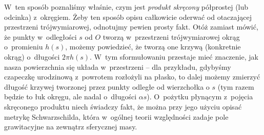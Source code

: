 W~ten sposób 
poznaliśmy właśnie, czym jest \emph{produkt skręcony} półprostej (lub odcinka) z~okręgiem. Żeby ten sposób opisu całkowicie oderwać od otaczającej przestrzeni trójwymiarowej, odnotujmy pewien prosty fakt. Otóż zamiast mówić, że punkty w~odległości $s$ od $O$ tworzą w~przestrzeni trójwymiarowej okrąg o~promieniu $h(s)$, możemy powiedzieć, że tworzą one krzywą (konkretnie okrąg) o~długości $2 \pi h(s)$. W~tym sformułowaniu przestaje mieć znaczenie, jak nasza powierzchnia się układa w~przestrzeni -- dla przykładu, gdybyśmy czapeczkę urodzinową z~powrotem rozłożyli na płasko, to dalej możemy zmierzyć długość krzywej tworzonej przez punkty odległe od wierzchołka o $s$ (tym razem będzie to łuk okręgu, ale nadal o~długości $\alpha s$). 
O~pożytku płynącym z~pojęcia skręconego produktu niech świadczy fakt, że można przy jego użyciu opisać metrykę Schwarzschilda, która w~ogólnej teorii względności zadaje pole grawitacyjne na zewnątrz sferycznej masy. 

